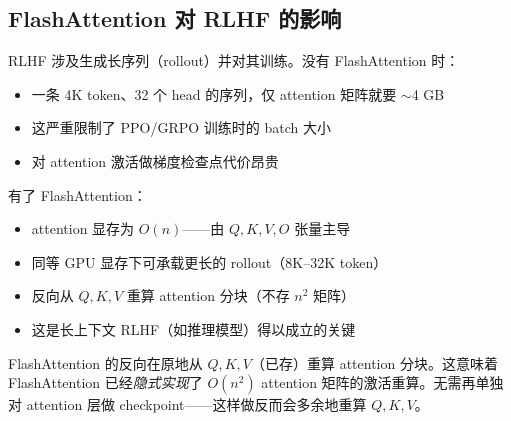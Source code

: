 \subsection{FlashAttention 对 RLHF 的影响}
\label{flash-attentions-impact-on-rlhf}

\begin{intuitionbox}
RLHF 涉及生成长序列（rollout）并对其训练。没有 FlashAttention 时：

\begin{itemize}
  \item 一条 4K token、32 个 head 的序列，仅 attention 矩阵就要 $\sim$4 GB
  \item 这严重限制了 PPO/GRPO 训练时的 batch 大小
  \item 对 attention 激活做梯度检查点代价昂贵
\end{itemize}

有了 FlashAttention：

\begin{itemize}
  \item attention 显存为 $O(n)$——由 $Q, K, V, O$ 张量主导
  \item 同等 GPU 显存下可承载更长的 rollout（8K--32K token）
  \item 反向从 $Q, K, V$ 重算 attention 分块（不存 $n^2$ 矩阵）
  \item 这是长上下文 RLHF（如推理模型）得以成立的关键
\end{itemize}
\end{intuitionbox}

\begin{warningbox}
FlashAttention 的反向在原地从 $Q, K, V$（已存）重算 attention 分块。这意味着 FlashAttention 已经\emph{隐式实现}了 $O(n^2)$ attention 矩阵的激活重算。无需再单独对 attention 层做 checkpoint——这样做反而会多余地重算 $Q, K, V$。
\end{warningbox}

